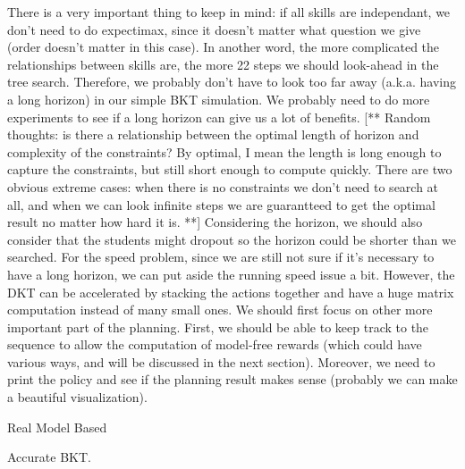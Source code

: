 There is a very important thing to keep in mind: if all skills are independant, we don’t need to do expectimax, since it doesn’t matter what question we give (order doesn’t matter in this case). In another word, the more complicated the relationships between skills are, the more
22
steps we should look-ahead in the tree search. Therefore, we probably don’t have to look too far away (a.k.a. having a long horizon) in our simple BKT simulation. We probably need to do more experiments to see if a long horizon can give us a lot of benefits.
[** Random thoughts: is there a relationship between the optimal length of horizon and complexity of the constraints? By optimal, I mean the length is long enough to capture the constraints, but still short enough to compute quickly. There are two obvious extreme cases: when there is no constraints we don’t need to search at all, and when we can look infinite steps we are guarantteed to get the optimal result no matter how hard it is. **]
Considering the horizon, we should also consider that the students might dropout so the horizon could be shorter than we searched.
For the speed problem, since we are still not sure if it’s necessary to have a long horizon, we can put aside the running speed issue a bit. However, the DKT can be accelerated by stacking the actions together and have a huge matrix computation instead of many small ones.
We should first focus on other more important part of the planning. First, we should be able to keep track to the sequence to allow the computation of model-free rewards (which could have various ways, and will be discussed in the next section). Moreover, we need to print the policy and see if the planning result makes sense (probably we can make a beautiful visualization).


Real Model Based

Accurate BKT.